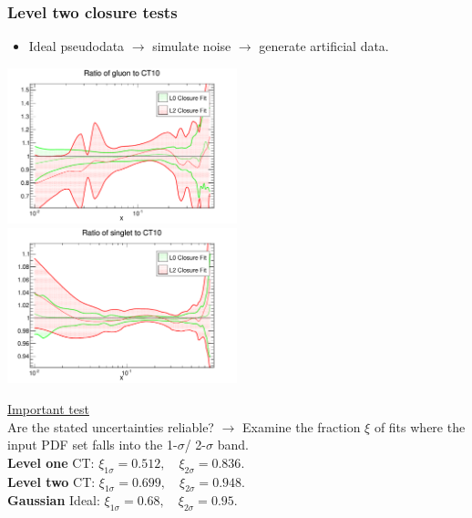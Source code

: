 \documentclass[10pt]{beamer}
\begin{document}
\begin{frame}
\frametitle{Level two closure tests}
\begin{itemize}
\item Ideal pseudodata $\to$ simulate noise $\to$ generate artificial data.
\end{itemize}
\includegraphics[width=0.5\textwidth]{figures/gluon.pdf}
\includegraphics[width=0.5\textwidth]{figures/singlet.pdf}

\underline{Important test}\\
Are the stated uncertainties reliable? $\to$ Examine the fraction $\xi$ of fits where the input PDF set falls into the 1-$\sigma$/ 2-$\sigma$ band.\\
\vskip 10pt
\textbf{Level one} CT:  $\xi_{1\sigma} = 0.512, \quad \xi_{2\sigma} = 0.836$. \\
\textbf{Level two} CT:   $\xi_{1\sigma} = 0.699, \quad \xi_{2\sigma} = 0.948$. \\
\textbf{Gaussian} Ideal: $\xi_{1\sigma} = 0.68, \quad \xi_{2\sigma} = 0.95$.
\end{frame}
\end{document}
